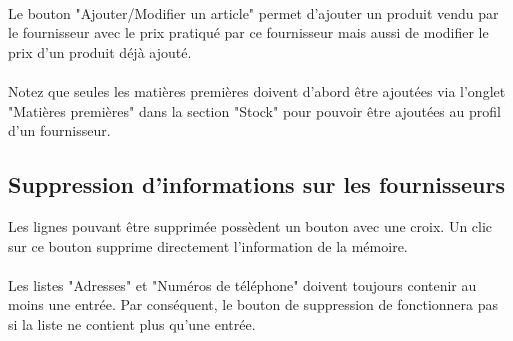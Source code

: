 \paragraph{}
Le bouton "Ajouter/Modifier un article" permet d'ajouter un produit vendu par le
fournisseur avec le prix pratiqué par ce fournisseur mais aussi de modifier le
prix d'un produit déjà ajouté.

\paragraph{}
Notez que seules les matières premières doivent
d'abord être ajoutées via l'onglet "Matières premières" dans la section "Stock"
pour pouvoir être ajoutées au profil d'un fournisseur.

\subsection{Suppression d'informations sur les fournisseurs}
Les lignes pouvant être supprimée possèdent
un bouton avec une croix. Un clic sur ce bouton supprime directement
l'information de la mémoire.

\paragraph{}
Les listes "Adresses" et "Numéros de téléphone" doivent toujours contenir au
moins une entrée. Par conséquent, le bouton de suppression de fonctionnera pas
si la liste ne contient plus qu'une entrée.
